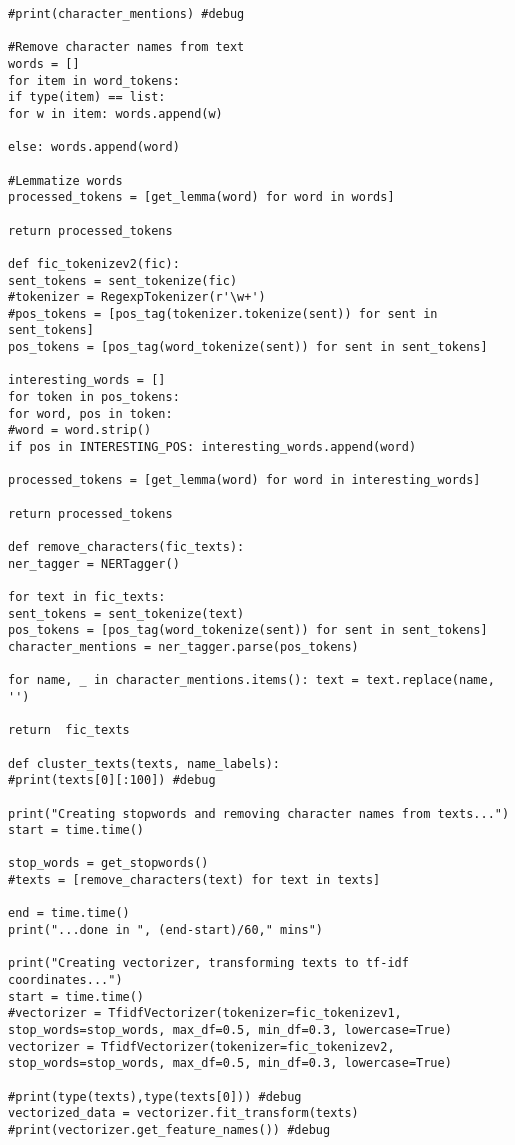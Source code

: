 \documentclass{pre-tfg}
\begin{document}
\begin{lstlisting}[style=consola]
#print(character_mentions) #debug

#Remove character names from text
words = []
for item in word_tokens:
if type(item) == list:
for w in item: words.append(w)

else: words.append(word)

#Lemmatize words
processed_tokens = [get_lemma(word) for word in words]

return processed_tokens

def fic_tokenizev2(fic):
sent_tokens = sent_tokenize(fic)
#tokenizer = RegexpTokenizer(r'\w+')
#pos_tokens = [pos_tag(tokenizer.tokenize(sent)) for sent in sent_tokens]
pos_tokens = [pos_tag(word_tokenize(sent)) for sent in sent_tokens]

interesting_words = []
for token in pos_tokens:
for word, pos in token:
#word = word.strip()
if pos in INTERESTING_POS: interesting_words.append(word)

processed_tokens = [get_lemma(word) for word in interesting_words]

return processed_tokens

def remove_characters(fic_texts):
ner_tagger = NERTagger()

for text in fic_texts:
sent_tokens = sent_tokenize(text)
pos_tokens = [pos_tag(word_tokenize(sent)) for sent in sent_tokens]
character_mentions = ner_tagger.parse(pos_tokens)

for name, _ in character_mentions.items(): text = text.replace(name, '')

return 	fic_texts

def cluster_texts(texts, name_labels):
#print(texts[0][:100]) #debug

print("Creating stopwords and removing character names from texts...")
start = time.time()

stop_words = get_stopwords()
#texts = [remove_characters(text) for text in texts]

end = time.time()
print("...done in ", (end-start)/60," mins")

print("Creating vectorizer, transforming texts to tf-idf coordinates...")
start = time.time()
#vectorizer = TfidfVectorizer(tokenizer=fic_tokenizev1, stop_words=stop_words, max_df=0.5, min_df=0.3, lowercase=True)
vectorizer = TfidfVectorizer(tokenizer=fic_tokenizev2, stop_words=stop_words, max_df=0.5, min_df=0.3, lowercase=True)

#print(type(texts),type(texts[0])) #debug
vectorized_data = vectorizer.fit_transform(texts)
#print(vectorizer.get_feature_names()) #debug


\end{lstlisting}
\end{document}
